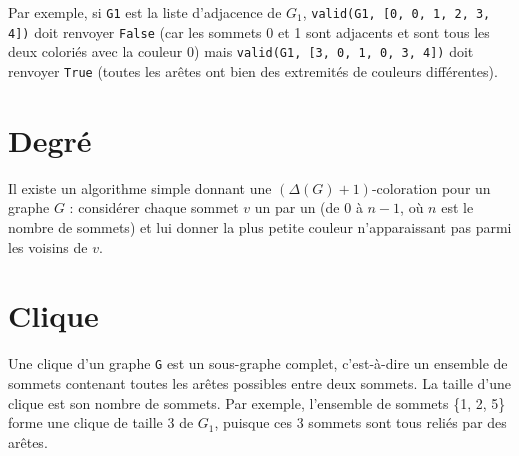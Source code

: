 
Par exemple, si \lstinline{G1} est la liste d’adjacence de $G_1$, \lstinline{valid(G1, [0, 0, 1, 2, 3, 4])} doit renvoyer \lstinline{False} (car les sommets
0 et 1 sont adjacents et sont tous les deux coloriés avec la couleur 0) mais \lstinline{valid(G1, [3, 0, 1, 0, 3, 4])} doit renvoyer
\lstinline{True} (toutes les arêtes ont bien des extremités de couleurs différentes).



\section*{Degré}


Il existe un algorithme simple donnant une $(\Delta(G) + 1)$-coloration pour un graphe $G$ : considérer chaque sommet $v$ un par un
(de 0 à $n - 1$, où $n$ est le nombre de sommets) et lui donner la plus petite couleur n’apparaissant pas parmi les voisins de $v$.


\section*{Clique}
Une clique d’un graphe \lstinline{G} est un sous-graphe complet, c’est-à-dire un ensemble de sommets contenant toutes les arêtes possibles
entre deux sommets. La taille d’une clique est son nombre de sommets.
Par exemple, l’ensemble de sommets \{1, 2, 5\} forme une clique de taille 3 de $G_1$, puisque ces 3 sommets sont tous reliés par des
arêtes.


